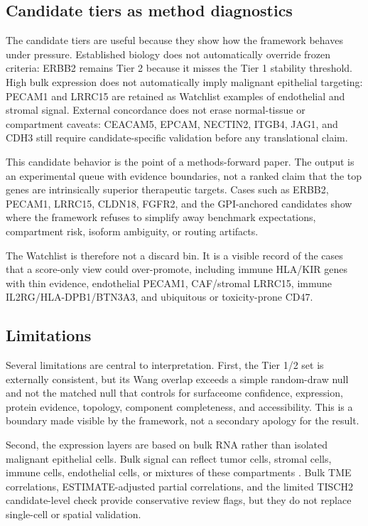 \documentclass[preprint,12pt,authoryear]{elsarticle}
\begin{document}
\subsection{Candidate tiers as method diagnostics}

The candidate tiers are useful because they show how the framework behaves under pressure. Established biology does not automatically override frozen criteria: ERBB2 remains Tier 2 because it misses the Tier 1 stability threshold. High bulk expression does not automatically imply malignant epithelial targeting: PECAM1 and LRRC15 are retained as Watchlist examples of endothelial and stromal signal. External concordance does not erase normal-tissue or compartment caveats: CEACAM5, EPCAM, NECTIN2, ITGB4, JAG1, and CDH3 still require candidate-specific validation before any translational claim.

This candidate behavior is the point of a methods-forward paper. The output is an experimental queue with evidence boundaries, not a ranked claim that the top genes are intrinsically superior therapeutic targets. Cases such as ERBB2, PECAM1, LRRC15, CLDN18, FGFR2, and the GPI-anchored candidates show where the framework refuses to simplify away benchmark expectations, compartment risk, isoform ambiguity, or routing artifacts.

The Watchlist is therefore not a discard bin. It is a visible record of the cases that a score-only view could over-promote, including immune HLA/\allowbreak{}KIR genes with thin evidence, endothelial PECAM1, CAF/\allowbreak{}stromal LRRC15, immune IL2RG/\allowbreak{}HLA-DPB1/\allowbreak{}BTN3A3, and ubiquitous or toxicity-prone CD47.

\subsection{Limitations}

Several limitations are central to interpretation. First, the Tier 1/\allowbreak{}2 set is externally consistent, but its Wang overlap exceeds a simple random-draw null and not the matched null that controls for surfaceome confidence, expression, protein evidence, topology, component completeness, and accessibility. This is a boundary made visible by the framework, not a secondary apology for the result.

Second, the expression layers are based on bulk RNA rather than isolated malignant epithelial cells. Bulk signal can reflect tumor cells, stromal cells, immune cells, endothelial cells, or mixtures of these compartments \citep{yoshihara2013estimate,han2023tisch2,zhang2019gastric_scrna,jeong2021gastric_tme}. Bulk TME correlations, ESTIMATE-adjusted partial correlations, and the limited TISCH2 candidate-level check provide conservative review flags, but they do not replace single-cell or spatial validation.
\end{document}
